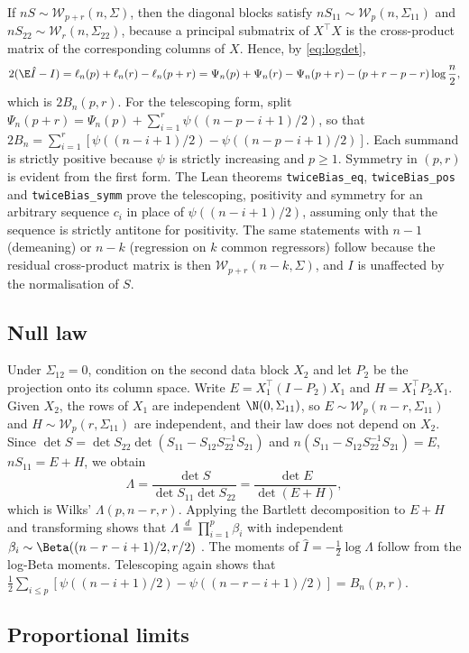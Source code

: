 If $nS\sim\mathcal W_{p+r}(n,\Sigma)$, then the diagonal blocks satisfy $nS_{11}\sim\mathcal W_p(n,\Sigma_{11})$ and $nS_{22}\sim\mathcal W_r(n,\Sigma_{22})$, because a principal submatrix of $X^\top X$ is the cross-product matrix of the corresponding columns of $X$. Hence, by \eqref{eq:logdet},
\[
 2(\E\hat I-I)=\ell_n(p)+\ell_n(r)-\ell_n(p+r)
 =\Psi_n(p)+\Psi_n(r)-\Psi_n(p+r)-(p+r-p-r)\log\frac n2,
\]
which is $2B_n(p,r)$. For the telescoping form, split $\Psi_n(p+r)=\Psi_n(p)+\sum_{i=1}^r\psi((n-p-i+1)/2)$, so that $2B_n=\sum_{i=1}^r[\psi((n-i+1)/2)-\psi((n-p-i+1)/2)]$. Each summand is strictly positive because $\psi$ is strictly increasing and $p\ge1$. Symmetry in $(p,r)$ is evident from the first form. The Lean theorems \texttt{twiceBias\_eq}, \texttt{twiceBias\_pos} and \texttt{twiceBias\_symm} prove the telescoping, positivity and symmetry for an arbitrary sequence $c_i$ in place of $\psi((n-i+1)/2)$, assuming only that the sequence is strictly antitone for positivity. The same statements with $n-1$ (demeaning) or $n-k$ (regression on $k$ common regressors) follow because the residual cross-product matrix is then $\mathcal W_{p+r}(n-k,\Sigma)$, and $I$ is unaffected by the normalisation of $S$.

\subsection*{Null law}

Under $\Sigma_{12}=0$, condition on the second data block $X_2$ and let $P_2$ be the projection onto its column space. Write $E=X_1^\top(I-P_2)X_1$ and $H=X_1^\top P_2X_1$. Given $X_2$, the rows of $X_1$ are independent $\N(0,\Sigma_{11})$, so $E\sim\mathcal W_p(n-r,\Sigma_{11})$ and $H\sim\mathcal W_p(r,\Sigma_{11})$ are independent, and their law does not depend on $X_2$. Since $\det S=\det S_{22}\det(S_{11}-S_{12}S_{22}^{-1}S_{21})$ and $n(S_{11}-S_{12}S_{22}^{-1}S_{21})=E$, $nS_{11}=E+H$, we obtain
\[
 \Lambda=\frac{\det S}{\det S_{11}\det S_{22}}=\frac{\det E}{\det(E+H)},
\]
which is Wilks' $\Lambda(p,n-r,r)$. Applying the Bartlett decomposition to $E+H$ and transforming shows that $\Lambda\stackrel d=\prod_{i=1}^p\beta_i$ with independent $\beta_i\sim\Beta((n-r-i+1)/2,r/2)$ \citep[Ch.~8]{anderson2003introduction}. The moments of $\hat I=-\tfrac12\log\Lambda$ follow from the log-Beta moments. Telescoping again shows that $\tfrac12\sum_{i\le p}[\psi((n-i+1)/2)-\psi((n-r-i+1)/2)]=B_n(p,r)$.

\subsection*{Proportional limits}

